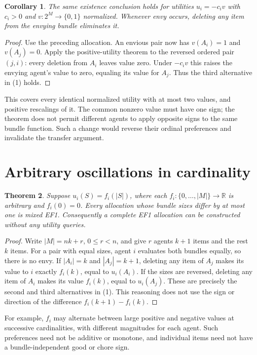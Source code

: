 \documentclass[11pt]{article}
\newtheorem{theorem}{Theorem}
\newtheorem{corollary}[theorem]{Corollary}
\theoremstyle{definition}
\begin{document}
\begin{corollary}
The same existence conclusion holds for utilities $u_i=-c_i v$ with
$c_i>0$ and $v:2^M\to\{0,1\}$ normalized. Whenever envy occurs,
deleting any item from the \emph{envying} bundle eliminates it.
\end{corollary}
\begin{proof}
Use the preceding allocation. An envious pair now has $v(A_i)=1$ and
$v(A_j)=0$. Apply the positive-utility theorem to the reversed ordered
pair $(j,i)$: every deletion from $A_i$ leaves value zero. Under $-c_i v$
this raises the envying agent's value to zero, equaling its value for
$A_j$. Thus the third alternative in (1) holds.
\end{proof}
This covers every identical normalized utility with at most two values,
and positive rescalings of it. The common nonzero value must have one
sign; the theorem does not permit different agents to apply opposite
signs to the same bundle function. Such a change would reverse their
ordinal preferences and invalidate the transfer argument.

\section*{Arbitrary oscillations in cardinality}
\begin{theorem}
Suppose $u_i(S)=f_i(|S|)$, where each
$f_i:\{0,\ldots,|M|\}\to\mathbb R$ is arbitrary and $f_i(0)=0$.
Every allocation whose bundle sizes differ by at most one is mixed EF1.
Consequently a complete EF1 allocation can be constructed without any
utility queries.
\end{theorem}
\begin{proof}
Write $|M|=nk+r$, $0\le r<n$, and give $r$ agents $k+1$ items and
the rest $k$ items. For a pair with equal sizes, agent $i$ evaluates both
bundles equally, so there is no envy. If $|A_i|=k$ and $|A_j|=k+1$,
deleting any item of $A_j$ makes its value to $i$ exactly $f_i(k)$,
equal to $u_i(A_i)$. If the sizes are reversed, deleting any item of
$A_i$ makes its value $f_i(k)$, equal to $u_i(A_j)$. These are precisely
the second and third alternatives in (1). This reasoning does not use
the sign or direction of the difference $f_i(k+1)-f_i(k)$.
\end{proof}
For example, $f_i$ may alternate between large positive and negative
values at successive cardinalities, with different magnitudes for each
agent. Such preferences need not be additive or monotone, and individual
items need not have a bundle-independent good or chore sign.
\end{document}
